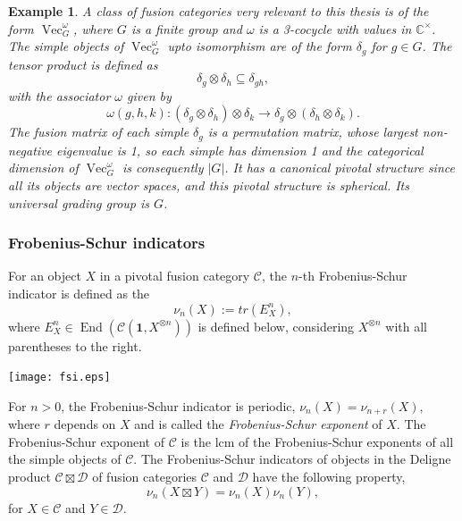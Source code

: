 \documentclass[a4paper, 10pt]{book}
\newtheorem{Expl}[theorem]{Example}
\theoremstyle{definition}
\numberwithin{equation}{chapter}
\newcommand\End{\operatorname{End}}
\newcommand\ot{\otimes}
\newcommand\Vect{\operatorname{Vec}}
\newcommand\CC{\mathbb C}
\newcommand\C{\mathcal C}
\newcommand\D{\mathcal D}
\newcommand{\ra}\rightarrow
\newcommand\one{\mathbf{1}}
\begin{document}
\begin{Expl}\rm\label{VecOmegaG}
A class of fusion categories very relevant to this thesis is of the form $\Vect^\omega_G$, where $G$ is a finite group and $\omega$ is a 3-cocycle with values in $\CC^\times$. The simple objects of $\Vect^\omega_G$ upto isomorphism are of the form $\delta_g$ for $g\in G$. The tensor product is defined as \begin{equation*}
	\delta_g\ot \delta_h \subseteq \delta_{gh},
\end{equation*} with the associator $\omega$ given by \begin{equation*}
	\omega(g, h, k): (\delta_g \ot \delta_h)\ot \delta_k \ra \delta_g \ot (\delta_h\ot \delta_k).
\end{equation*}
The fusion matrix of each simple $\delta_g$ is a permutation matrix, whose largest non-negative eigenvalue is 1, so each simple has dimension 1 and the categorical dimension of $\Vect^\omega_G$ is consequently $|G|$. It has a canonical pivotal structure since all its objects are vector spaces, and this pivotal structure is spherical. Its universal grading group is $G$. 
\end{Expl}

\subsubsection{Frobenius-Schur indicators}
For an object $X$ in a pivotal fusion category $\C$, the $n$-th Frobenius-Schur indicator is defined as the \begin{equation*}
	\nu_n(X) := tr(E_X^n),
\end{equation*} where $E_X^n\in  \End(\C(\one, X^{\ot n}))$ is defined below, considering $X^{\ot n}$ with all parentheses to the right.
\begin{center}
\texttt{[image: fsi.eps]}
\end{center}
For $n>0$, the Frobenius-Schur indicator is periodic, $\nu_n(X) = \nu_{n+r}(X)$, where $r$ depends on $X$ and is called the \textit{Frobenius-Schur exponent} of $X$. The Frobenius-Schur exponent of $\C$ is the lcm of the Frobenius-Schur exponents of all the simple objects of $\C$. The Frobenius-Schur indicators of objects in the Deligne product $\C\boxtimes \D$ of fusion categories $\C$ and $\D$ have the following property,
\begin{equation}\label{fsideligne}
	\nu_n(X\boxtimes Y) = \nu_n(X)\nu_n(Y),
\end{equation} for $X\in \C$ and $Y\in \D$.
\end{document}

